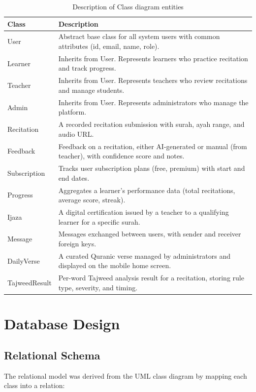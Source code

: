 \begin{table}[H]
  \centering
  \caption{Description of Class diagram entities}
  \label{tab:cs_class_desc}
  \renewcommand{\arraystretch}{1.3}
  \begin{tabular}{lp{10cm}}
    \toprule
    \textbf{Class} & \textbf{Description} \\
    \midrule
    User & Abstract base class for all system users with common attributes (id, email, name, role). \\
    Learner & Inherits from User. Represents learners who practice recitation and track progress. \\
    Teacher & Inherits from User. Represents teachers who review recitations and manage students. \\
    Admin & Inherits from User. Represents administrators who manage the platform. \\
    Recitation & A recorded recitation submission with surah, ayah range, and audio URL. \\
    Feedback & Feedback on a recitation, either AI-generated or manual (from teacher), with confidence score and notes. \\
    Subscription & Tracks user subscription plans (free, premium) with start and end dates. \\
    Progress & Aggregates a learner's performance data (total recitations, average score, streak). \\
    Ijaza & A digital certification issued by a teacher to a qualifying learner for a specific surah. \\
    Message & Messages exchanged between users, with sender and receiver foreign keys. \\
    DailyVerse & A curated Quranic verse managed by administrators and displayed on the mobile home screen. \\
    TajweedResult & Per-word Tajweed analysis result for a recitation, storing rule type, severity, and timing. \\
    \bottomrule
  \end{tabular}
\end{table}

\section{Database Design}
\label{sec:cs_database}

\subsection{Relational Schema}
The relational model was derived from the UML class diagram by mapping each class into a relation:

